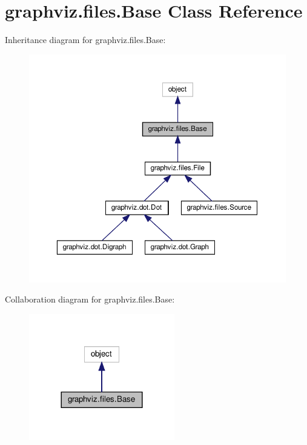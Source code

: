 \hypertarget{classgraphviz_1_1files_1_1Base}{}\section{graphviz.\+files.\+Base Class Reference}
\label{classgraphviz_1_1files_1_1Base}


Inheritance diagram for graphviz.\+files.\+Base\+:
\nopagebreak
\begin{figure}[H]
\begin{center}
\leavevmode
\includegraphics[width=350pt]{classgraphviz_1_1files_1_1Base__inherit__graph}
\end{center}
\end{figure}


Collaboration diagram for graphviz.\+files.\+Base\+:
\nopagebreak
\begin{figure}[H]
\begin{center}
\leavevmode
\includegraphics[width=180pt]{classgraphviz_1_1files_1_1Base__coll__graph}
\end{center}
\end{figure}
